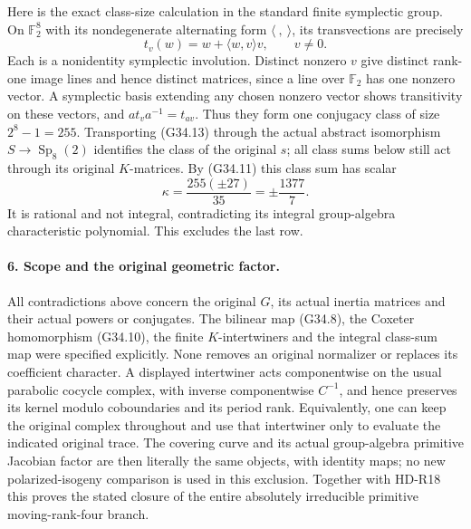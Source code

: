 Here is the exact class-size calculation in the standard
finite symplectic group. On \(\mathbb F_2^8\) with its
nondegenerate alternating form \(\langle\ ,\ \rangle\),
its transvections are precisely
\[
                  t_v(w)=w+\langle w,v\rangle v,
                       \qquad v\ne0.                    \tag{G34.13}
\]
Each is a nonidentity symplectic involution. Distinct nonzero
\(v\) give distinct rank-one image lines and hence distinct
matrices, since a line over \(\mathbb F_2\) has one nonzero
vector. A symplectic basis extending any chosen nonzero vector
shows transitivity on these vectors, and
\(a t_v a^{-1}=t_{av}\). Thus they form one conjugacy class
of size \(2^8-1=255\). Transporting (G34.13) through the
actual abstract isomorphism \(S\to\operatorname{Sp}_8(2)\)
identifies the class of the original \(s\); all class sums
below still act through its original \(K\)-matrices.
By (G34.11) this class sum has scalar
\[
                    \kappa=\frac{255(\pm27)}{35}
                            =\pm\frac{1377}{7}.          \tag{G34.14}
\]
It is rational and not integral, contradicting its integral
group-algebra characteristic polynomial. This excludes the
last row.

\paragraph{6. Scope and the original geometric factor.}
All contradictions above concern the original \(G\), its
actual inertia matrices and their actual powers or conjugates.
The bilinear map (G34.8), the Coxeter homomorphism (G34.10),
the finite \(K\)-intertwiners and the integral class-sum map
were specified explicitly. None removes an original normalizer
or replaces its coefficient character. A displayed intertwiner
acts componentwise on the usual parabolic cocycle complex,
with inverse componentwise \(C^{-1}\), and hence preserves its
kernel modulo coboundaries and its period rank. Equivalently,
one can keep the original complex throughout and use that
intertwiner only to evaluate the indicated original trace.
The covering curve and its actual group-algebra primitive
Jacobian factor are then literally the same objects, with
identity maps; no new polarized-isogeny comparison is used in
this exclusion. Together with HD-R18 this proves the stated
closure of the entire absolutely irreducible primitive
moving-rank-four branch.
